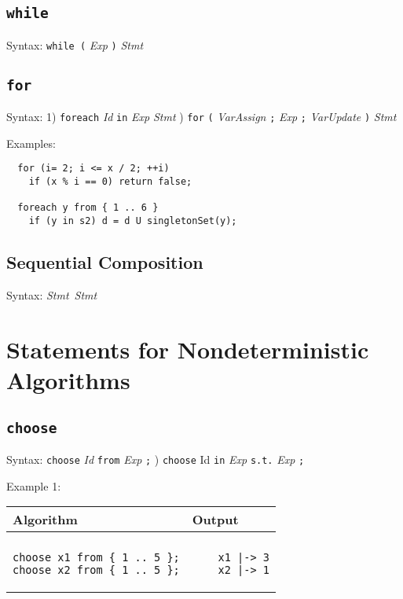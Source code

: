 \documentclass[a4paper]{report}
\begin{document}
\subsection{\texttt{while}}

Syntax: \verb'while (' {\it Exp} \verb')' {\it Stmt}


\subsection{\texttt{for}}

Syntax: 1) \verb"foreach" {\it Id} \verb"in" {\it Exp}  {\it Stmt} ) \verb"for" \verb"(" {\it VarAssign} \verb";" {\it Exp} \verb";" {\it VarUpdate} \verb")" {\it Stmt}

Examples:
\begin{verbatim}
  for (i= 2; i <= x / 2; ++i)
    if (x % i == 0) return false;

  foreach y from { 1 .. 6 }
    if (y in s2) d = d U singletonSet(y);
\end{verbatim}



\subsection{Sequential Composition}

Syntax: {\it Stmt}~{\it Stmt}

\section{Statements for Nondeterministic Algorithms}

\subsection{\texttt{choose}}

Syntax:  \verb"choose" {\it Id} \verb"from" {\it Exp} \verb";"  ) \verb"choose" Id \verb"in" {\it Exp} \verb"s.t." {\it Exp} \verb";"

Example 1:
\begin{center}
\begin{tabular}{ll}
Algorithm & Output\\
\hline
\\
\begin{minipage}{.45\textwidth}
\begin{verbatim}
choose x1 from { 1 .. 5 };
choose x2 from { 1 .. 5 };
\end{verbatim}
\end{minipage}
&
\begin{minipage}{.45\textwidth}
\begin{verbatim}
    x1 |-> 3
    x2 |-> 1
\end{verbatim}
\end{minipage}
\end{tabular}
\end{center}
\end{document}
